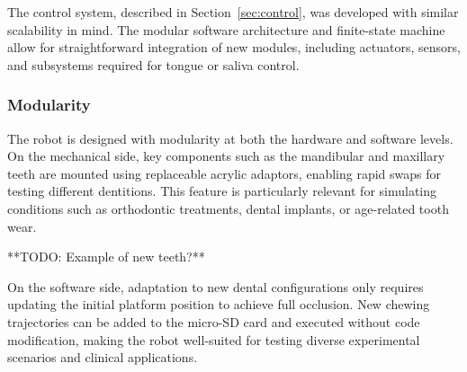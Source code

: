 The control system, described in Section~\ref{sec:control}, was developed with similar scalability in mind. The modular software architecture and finite-state machine 
allow for straightforward integration of new modules, including actuators, sensors, and subsystems required for tongue or saliva control.

\subsubsection{Modularity} 
The robot is designed with modularity at both the hardware and software levels. On the mechanical side, key components such as the mandibular and maxillary teeth are mounted using 
replaceable acrylic adaptors, enabling rapid swaps for testing different dentitions. This feature is particularly relevant for simulating conditions such as orthodontic treatments, 
dental implants, or age-related tooth wear.

**TODO: Example of new teeth?**

On the software side, adaptation to new dental configurations only requires updating the initial platform position to achieve full occlusion. New chewing trajectories can be added to 
the micro-SD card and executed without code modification, making the robot well-suited for testing diverse experimental scenarios and clinical applications.


